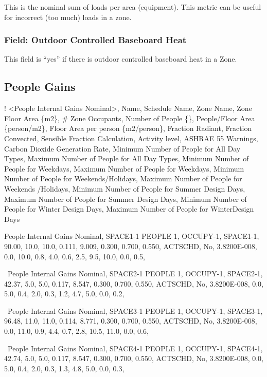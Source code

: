 This is the nominal sum of loads per area (equipment). This metric can be useful for incorrect (too much) loads in a zone.

\subsubsection{Field: Outdoor Controlled Baseboard Heat}\label{field-outdoor-controlled-baseboard-heat}

This field is ``yes'' if there is outdoor controlled baseboard heat in a Zone.

\subsection{People Gains}\label{people-gains}

! \textless{}People Internal Gains Nominal\textgreater{}, Name, Schedule Name, Zone Name, Zone Floor Area \{m2\}, \# Zone Occupants, Number of People \{\}, People/Floor Area \{person/m2\}, Floor Area per person \{m2/person\}, Fraction Radiant, Fraction Convected, Sensible Fraction Calculation, Activity level, ASHRAE 55 Warnings, Carbon Dioxide Generation Rate, Minimum Number of People for All Day Types, Maximum Number of People for All Day Types, Minimum Number of People for Weekdays,  Maximum Number of People for Weekdays,  Minimum Number of People for Weekends/Holidays,  Maximum Number of People for Weekends /Holidays, Minimum Number of People for Summer Design Days,  Maximum Number of People for Summer Design Days, Minimum Number of People for Winter Design Days,  Maximum Number of People for WinterDesign Days

 People Internal Gains Nominal,  SPACE1-1 PEOPLE 1, OCCUPY-1, SPACE1-1, 90.00, 10.0, 10.0, 0.111, 9.009, 0.300, 0.700, 0.550, ACTSCHD, No, 3.8200E-008, 0.0, 10.0, 0.8, 4.0, 0.6, 2.5, 9.5, 10.0, 0.0, 0.5,

~People Internal Gains Nominal,  SPACE2-1 PEOPLE 1, OCCUPY-1, SPACE2-1, 42.37, 5.0, 5.0, 0.117, 8.547, 0.300, 0.700, 0.550, ACTSCHD, No, 3.8200E-008, 0.0, 5.0, 0.4, 2.0, 0.3, 1.2, 4.7, 5.0, 0.0, 0.2,

~People Internal Gains Nominal,  SPACE3-1 PEOPLE 1, OCCUPY-1, SPACE3-1, 96.48, 11.0, 11.0, 0.114, 8.771, 0.300, 0.700, 0.550, ACTSCHD, No, 3.8200E-008, 0.0, 11.0, 0.9, 4.4, 0.7, 2.8, 10.5, 11.0, 0.0, 0.6,

~People Internal Gains Nominal,  SPACE4-1 PEOPLE 1, OCCUPY-1, SPACE4-1, 42.74, 5.0, 5.0, 0.117, 8.547, 0.300, 0.700, 0.550, ACTSCHD, No, 3.8200E-008, 0.0, 5.0, 0.4, 2.0, 0.3, 1.3, 4.8, 5.0, 0.0, 0.3,

